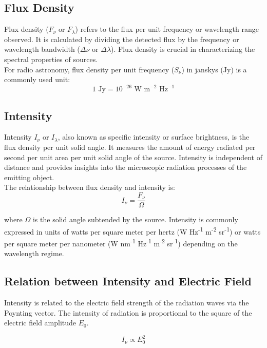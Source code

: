 \subsection{Flux Density}

Flux density ($F_{\nu}$ or $F_{\lambda}$) refers to the flux per unit frequency or wavelength range observed. It is calculated by dividing the detected flux by the frequency or wavelength bandwidth (\( \Delta \nu \) or \( \Delta \lambda \)). Flux density is crucial in characterizing the spectral properties of sources. \\

For radio astronomy, flux density per unit frequency (\( S_{\nu} \)) in janskys (Jy) is a commonly used unit:
\[ 1 \text{ Jy} = 10^{-26} \text{ W m}^{-2} \text{ Hz}^{-1} \]

\subsection{Intensity}

Intensity $I_{\nu}$ or $I_{\lambda}$, also known as specific intensity or surface brightness, is the flux density per unit solid angle. It measures the amount of energy radiated per second per unit area per unit solid angle of the source. Intensity is independent of distance and provides insights into the microscopic radiation processes of the emitting object. \\

The relationship between flux density and intensity is:
\[ I_\nu = \frac{F_\nu}{\Omega} \]

where \( \Omega \) is the solid angle subtended by the source. Intensity is commonly expressed in units of watts per square meter per hertz (W Hz\textsuperscript{-1} m\textsuperscript{-2} sr\textsuperscript{-1}) or watts per square meter per nanometer (W nm\textsuperscript{-1} Hz\textsuperscript{-1} m\textsuperscript{-2} sr\textsuperscript{-1}) depending on the wavelength regime.

\subsection{Relation between Intensity and Electric Field}

Intensity is related to the electric field strength of the radiation waves via the Poynting vector. The intensity of radiation is proportional to the square of the electric field amplitude \( E_0 \).

\[ I_\nu \propto E_0^2 \]

